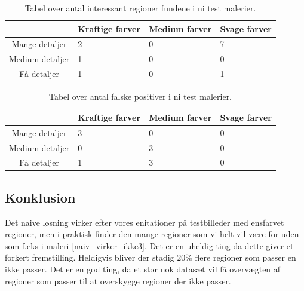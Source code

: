 \begin{table}[H]
    \centering
    \begin{tabular}{|c|l|l|l|}
            & Kraftige farver & Medium farver & Svage farver \\\hline
		Mange detaljer	& 2 & 0 & 7 \\\hline
        Medium detaljer  & 1 & 0 & 0 \\\hline
        Få detaljer     & 1 & 0 & 1 \\\hline
    \end{tabular}
    \caption[]{Tabel over antal interessant regioner fundene i ni test malerier.}
    \label{naiv_good}
\end{table}

\begin{table}[H]
    \centering
    \begin{tabular}{|c|l|l|l|}
            & Kraftige farver & Medium farver & Svage farver \\\hline
		Mange detaljer	& 3 & 0 & 0 \\\hline
        Medium detaljer  & 0 & 3 & 0 \\\hline
        Få detaljer     & 1 & 3 & 0 \\\hline
    \end{tabular}
    \caption[]{Tabel over antal falske positiver i ni test malerier.}
    \label{naiv_bad}
\end{table}

\subsection{Konklusion}
Det naive løsning virker efter vores enitationer på testbilleder med
ensfarvet regioner, men i praktisk finder den mange regioner som vi helt
vil være for uden som f.eks i maleri \ref{naiv_virker_ikke3}. Det er en
uheldig ting da dette giver et forkert fremstilling. Heldigvis bliver
der stadig $20 \%$ flere regioner som passer en ikke passer. Det er en
god ting, da et stor nok datasæt vil få overvægten af regioner som
passer til at overskygge regioner der ikke passer.

